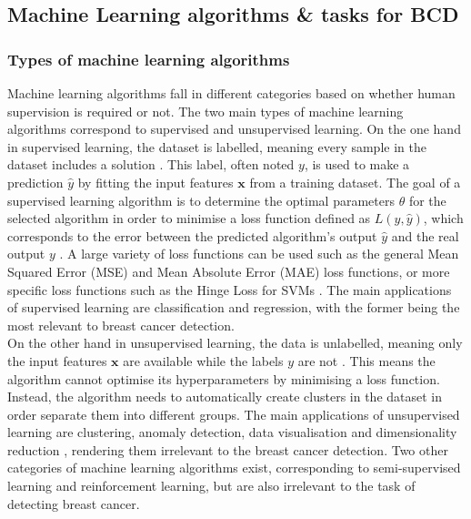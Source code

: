 \subsection{Machine Learning algorithms \& tasks for BCD}

\subsubsection{Types of machine learning algorithms}

Machine learning algorithms fall in different categories based on whether human supervision is required or not. The two main types of machine learning algorithms correspond to supervised and unsupervised learning. On the one hand in supervised learning, the dataset is labelled, meaning every sample in the dataset includes a solution \cite{Geron2019}. This label, often noted $y$, is used to make a prediction $\hat{y}$ by fitting the input features $\textbf{x}$ from a training dataset. The goal of a supervised learning algorithm is to determine the optimal parameters $\theta$ for the selected algorithm in order to minimise a loss function defined as $L(y,\hat{y})$, which corresponds to the error between the predicted algorithm's output $\hat{y}$ and the real output $y$ \cite{Litjens2017}. A large variety of loss functions can be used such as the general Mean Squared Error (MSE) and Mean Absolute Error (MAE) loss functions, or more specific loss functions such as the Hinge Loss for SVMs \cite{Geron2019}. The main applications of supervised learning are classification and regression, with the former being the most relevant to breast cancer detection.\\

On the other hand in unsupervised learning, the data is unlabelled, meaning only the input features $\textbf{x}$ are available while the labels $y$ are not \cite{Litjens2017}. This means the algorithm cannot optimise its hyperparameters by minimising a loss function. Instead, the algorithm needs to automatically create clusters in the dataset in order separate them into different groups. The main applications of unsupervised learning are clustering, anomaly detection, data visualisation and dimensionality reduction \cite{Geron2019}, rendering them irrelevant to the breast cancer detection. Two other categories of machine learning algorithms exist, corresponding to semi-supervised learning and reinforcement learning, but are also irrelevant to the task of detecting breast cancer.\\

